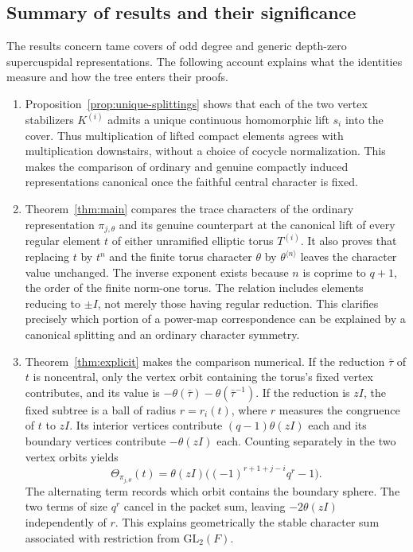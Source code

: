 \documentclass[12pt, letterpaper]{article}
\numberwithin{equation}{section}
\theoremstyle{definition}
\theoremstyle{remark}
\begin{document}
\subsection{Summary of results and their significance}\label{sec:summary}

The results concern tame covers of odd degree and generic depth-zero supercuspidal representations. The following account explains what the identities measure and how the tree enters their proofs.

\begin{enumerate}[label=(\roman*)]
\item Proposition~\ref{prop:unique-splittings} shows that each of the two vertex stabilizers $K^{(i)}$ admits a unique continuous homomorphic lift $s_i$ into the cover. Thus multiplication of lifted compact elements agrees with multiplication downstairs, without a choice of cocycle normalization. This makes the comparison of ordinary and genuine compactly induced representations canonical once the faithful central character is fixed.
\item Theorem~\ref{thm:main} compares the trace characters of the ordinary representation $\pi_{j,\theta}$ and its genuine counterpart at the canonical lift of every regular element $t$ of either unramified elliptic torus $T^{(i)}$. It also proves that replacing $t$ by $t^n$ and the finite torus character $\theta$ by $\theta^{\langle n\rangle}$ leaves the character value unchanged. The inverse exponent exists because $n$ is coprime to $q+1$, the order of the finite norm-one torus. The relation includes elements reducing to $\pm I$, not merely those having regular reduction. This clarifies precisely which portion of a power-map correspondence can be explained by a canonical splitting and an ordinary character symmetry.
\item Theorem~\ref{thm:explicit} makes the comparison numerical. If the reduction $\bar\tau$ of $t$ is noncentral, only the vertex orbit containing the torus's fixed vertex contributes, and its value is $-\theta(\bar\tau)-\theta(\bar\tau^{-1})$. If the reduction is $zI$, the fixed subtree is a ball of radius $r=r_i(t)$, where $r$ measures the congruence of $t$ to $zI$. Its interior vertices contribute $(q-1)\theta(zI)$ each and its boundary vertices contribute $-\theta(zI)$ each. Counting separately in the two vertex orbits yields
\[
 \Theta_{\pi_{j,\theta}}(t)=\theta(zI)\bigl((-1)^{r+1+j-i}q^r-1\bigr).
\]
The alternating term records which orbit contains the boundary sphere. The two terms of size $q^r$ cancel in the packet sum, leaving $-2\theta(zI)$ independently of $r$. This explains geometrically the stable character sum associated with restriction from $\mathrm{GL}_2(F)$.
\end{enumerate}
\end{document}
